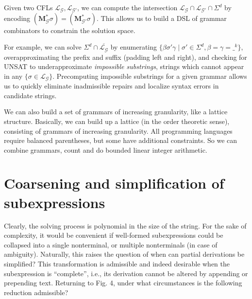 \documentclass[sigplan,review,anonymous,acmsmall]{acmart}\settopmatter{printfolios=false,printccs=false,printacmref=false}
\begin{document}
Given two CFLs $\mathcal{L}_\mathcal{G}, \mathcal{L}_{\mathcal{G}'}$, we can compute the intersection $\mathcal{L}_\mathcal{G}\cap\mathcal{L}_{\mathcal{G}'}\cap\Sigma^d$ by encoding $(\mathbf{M}_\mathcal{G}^*\sigma) = (\mathbf{M}_{\mathcal{G}'}^*\sigma)$. This allows us to build a DSL of grammar combinators to constrain the solution space.

For example, we can solve $\Sigma^d \cap \overline{\mathcal{L}_\mathcal{G}}$ by enumerating $\{\beta\sigma'\gamma \mid \sigma' \in \Sigma^d, \beta = \gamma = \_^k\}$, overapproximating the prefix and suffix (padding left and right), and checking for UNSAT to underapproximate \textit{impossible substrings}, strings which cannot appear in any $\{\sigma \in \mathcal{L}_\mathcal{G}\}$. Precomputing impossible substrings for a given grammar allows us to quickly eliminate inadmissible repairs and localize syntax errors in candidate strings.

We can also build a set of grammars of increasing granularity, like a lattice structure. Basically, we can build up a lattice (in the order theoretic sense), consisting of grammars of increasing granularity. All programming languages require balanced parentheses, but some have additional constraints. So we can combine grammars, count and do bounded linear integer arithmetic.

\section{Coarsening and simplification of subexpressions}

Clearly, the solving process is polynomial in the size of the string. For the sake of complexity, it would be convenient if well-formed subexpressions could be collapsed into a single nonterminal, or multiple nonterminals (in case of ambiguity). Naturally, this raises the question of when can partial derivations be simplified? This transformation is admissible and indeed desirable when the subexpression is ``complete'', i.e., its derivation cannot be altered by appending or prepending text. Returning to Fig. 4, under what circumstances is the following reduction admissible?
\end{document}
